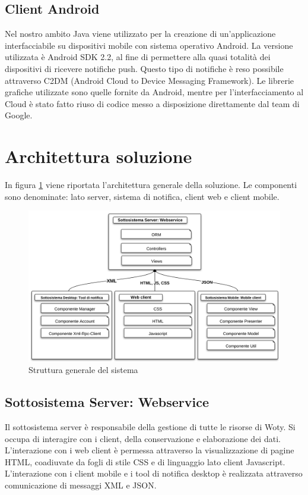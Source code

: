 \subsection{Client Android}
Nel nostro ambito Java viene utilizzato per la creazione di un'applicazione interfacciabile su dispositivi mobile con sistema operativo Android. La versione utilizzata è Android SDK 2.2, al fine di permettere alla quasi totalità dei dispositivi di ricevere notifiche push. Questo tipo di notifiche è reso possibile attraverso C2DM (Android Cloud to Device Messaging Framework). Le librerie grafiche utilizzate sono quelle fornite da Android, mentre per l'interfacciamento al Cloud è stato fatto riuso di codice messo a disposizione direttamente dal team di Google. 


\section{Architettura soluzione}

In figura \ref{StrutturaGeneraleSistema} viene riportata l'architettura generale della soluzione. Le componenti sono denominate: lato server, sistema di notifica, client web e client mobile. 

\begin{figure}[H]
\centering
\includegraphics[scale=0.6]{images/cap2/sistema.png} %
\caption{Struttura generale del sistema}
\label{StrutturaGeneraleSistema}
\end{figure}



\subsection{Sottosistema Server: Webservice}
Il sottosistema server è responsabile della gestione di tutte le risorse di Woty. Si occupa di interagire con i client, della conservazione e elaborazione dei dati. L'interazione con i web client è permessa attraverso la visualizzazione di pagine HTML, coadiuvate da fogli di stile CSS e di linguaggio lato client Javascript. L'interazione con i client mobile e i tool di notifica desktop è realizzata attraverso comunicazione di messaggi XML e JSON.


